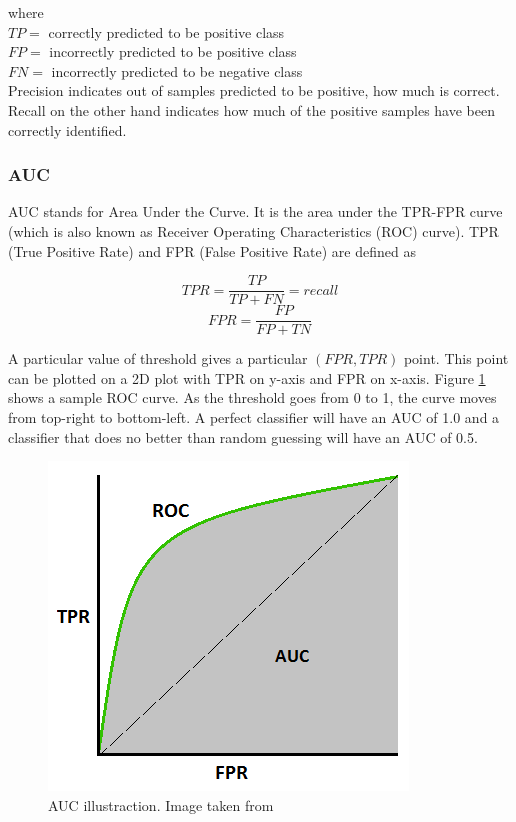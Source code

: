 where \\ 
$TP=$ correctly predicted to be positive class\\ 
$FP=$ incorrectly predicted to be positive class\\
$FN=$ incorrectly predicted to be negative class \\

Precision indicates out of samples predicted to be positive, how much is correct. Recall on the other hand indicates how much of the positive samples have been correctly identified. 

\subsubsection{AUC}
AUC stands for Area Under the Curve. It is the area under the TPR-FPR curve (which is also known as Receiver Operating Characteristics (ROC) curve). TPR (True Positive Rate) and FPR (False Positive Rate) are defined as 

$$ TPR = \frac{TP}{TP + FN} = recall$$
$$ FPR = \frac{FP}{FP + TN}$$

A particular value of threshold gives a particular $(FPR,TPR)$ point. This point can be plotted on a 2D plot with TPR on y-axis and FPR on x-axis. Figure \ref{fig:auc} shows a sample ROC curve. As the threshold goes from 0 to 1, the curve moves from top-right to bottom-left. A perfect classifier will have an AUC of 1.0 and a classifier that does no better than random guessing will have an AUC of 0.5. 


\begin{figure}
    \centering
    \includegraphics[width=0.6\linewidth]{images/auc.PNG}
    \caption[AUC illustraction]{AUC illustraction. Image taken from \cite{auc}}
    \label{fig:auc}
\end{figure}


